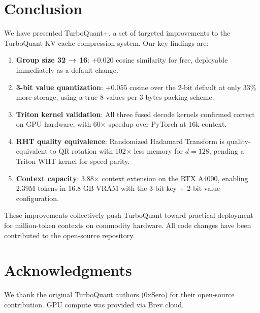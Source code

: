 \documentclass[10pt,twocolumn]{article}
\begin{document}
\section{Conclusion}
\label{sec:conclusion}

We have presented TurboQuant+, a set of targeted improvements to the TurboQuant KV cache compression system. Our key findings are:

\begin{enumerate}
\item \textbf{Group size 32 → 16}: $+0.020$ cosine similarity for free, deployable immediately as a default change.
\item \textbf{3-bit value quantization}: $+0.055$ cosine over the 2-bit default at only 33\% more storage, using a true 8-values-per-3-bytes packing scheme.
\item \textbf{Triton kernel validation}: All three fused decode kernels confirmed correct on GPU hardware, with 60$\times$ speedup over PyTorch at 16k context.
\item \textbf{RHT quality equivalence}: Randomized Hadamard Transform is quality-equivalent to QR rotation with 102$\times$ less memory for $d = 128$, pending a Triton WHT kernel for speed parity.
\item \textbf{Context capacity}: 3.88$\times$ context extension on the RTX A4000, enabling 2.39M tokens in 16.8 GB VRAM with the 3-bit key + 2-bit value configuration.
\end{enumerate}

These improvements collectively push TurboQuant toward practical deployment for million-token contexts on commodity hardware. All code changes have been contributed to the open-source repository.

\section*{Acknowledgments}

We thank the original TurboQuant authors (0xSero) for their open-source contribution. GPU compute was provided via Brev cloud.
\end{document}
